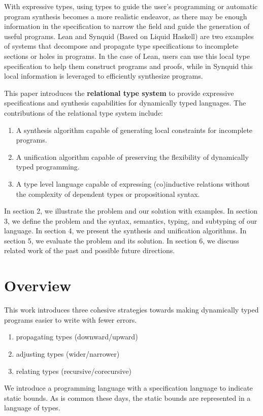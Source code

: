 \documentclass[sigplan,screen]{acmart}
\begin{document}
With expressive types, using types to guide the user's programming or automatic program synthesis 
becomes a more realistic endeavor, as there may be enough information in the specification to narrow the field
and guide the generation of useful programs. Lean and Synquid\cite{} (Based on Liquid Haskell) 
are two examples of systems that decompose and propagate type specifications 
to incomplete sections or holes in programs. 
In the case of Lean, users can use this local type specification to help them construct programs and proofs,
while in Synquid this local information is leveraged to efficiently synthesize programs. 

This paper introduces the \textbf{relational type system} to provide expressive specifications 
and synthesis capabilities for dynamically typed languages. 
The contributions of the relational type system include:
\begin{enumerate}
  \item A synthesis algorithm capable of generating local constraints for incomplete programs. 
  \item A unification algorithm capable of preserving the flexibility of dynamically typed programming. 
  \item A type level language capable of expressing (co)inductive relations without the complexity of dependent types or propositional syntax.  
\end{enumerate}



In section 2, we illustrate the problem and our solution with examples.
In section 3, we define the problem and the syntax, semantics, typing, and subtyping of our language.
In section 4, we present the synthesis and unification algorithms.
In section 5, we evaluate the problem and its solution. 
In section 6, we discuss related work of the past and possible future directions. 

\section{Overview}

This work introduces three cohesive strategies towards making
dynamically typed programs easier to write with fewer errors.  
\begin{enumerate}
  \item propagating types (downward/upward) 
  \item adjusting types (wider/narrower) 
  \item relating types (recursive/corecursive) 
\end{enumerate}
We introduce a programming language with a specification language to indicate static bounds. 
As is common these days, the static bounds are represented in a language of types.
\end{document}
